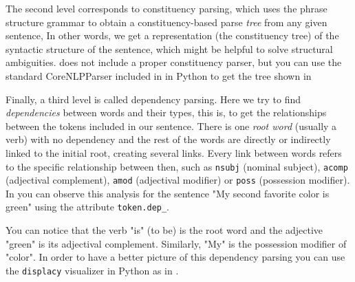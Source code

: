
The second level corresponds to constituency parsing, which uses the phrase structure grammar to obtain a constituency-based parse \textit{tree} from any given sentence, In other words, we get a representation (the constituency tree) of the syntactic structure of the sentence, which might be helpful to solve structural ambiguities.  does not include a proper constituency parser, but you can use the standard CoreNLPParser included in  in Python to get the tree shown in 


Finally, a third level is called dependency parsing. Here we try to find \textit{dependencies} between words and their types, this is, to get the relationships between the tokens included in our sentence. There is one \textit{root word} (usually a verb) with no dependency and the rest of the words are directly or indirectly linked to the initial root, creating several links. Every link between words refers to the specific relationship between then, such as \texttt{nsubj} (nominal subject), \texttt{acomp} (adjectival complement), \texttt{amod} (adjectival modifier) or \texttt{poss} (possession modifier). In  you can observe this analysis for the sentence "My second favorite color is green" using the attribute \verb|token.dep_|.


You can notice that the verb "is" (to be) is the root word and the adjective "green" is its adjectival complement. Similarly,  "My" is the possession modifier of "color". In order to have a better picture of this dependency parsing you can use the \texttt{displacy} visualizer in Python as in .


